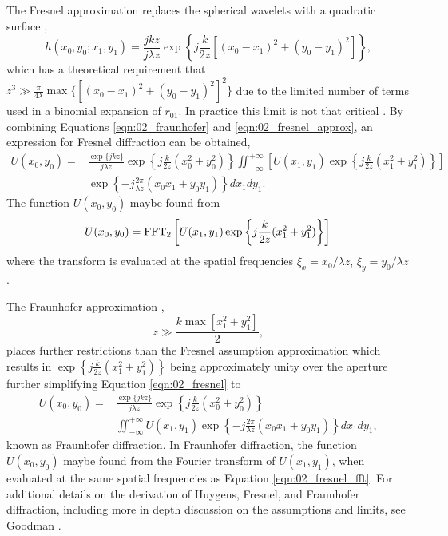 The Fresnel approximation replaces the spherical wavelets with a quadratic surface \cite{Fresnel-1818-FmMCMbDK},
\begin{equation}
  h(x_0,y_0;x_1,y_1) = \frac{jkz}{j\lambda z}\exp\left\{j\frac{k}{2z}[(x_0-x_1)^2+(y_0-y_1)^2]\right\} \textrm{,}
  \label{eqn:02_fresnel_approx}
\end{equation}
which has a theoretical requirement that $z^3 \gg \frac{\pi}{4\lambda}\max\{[(x_0-x_1)^2+(y_0-y_1)^2]^2\}$ due to the limited number of terms used in a binomial expansion of $r_{01}$.
In practice this limit is not that critical \cite{Goodman-1968-zPUmuuzx}.
By combining Equations \ref{eqn:02_fraunhofer} and \ref{eqn:02_fresnel_approx}, an expression for Fresnel diffraction can be obtained,
\begin{equation}
  \begin{aligned}
    U(x_0,y_0) =& \frac{\exp\{jkz\}}{j\lambda z}\exp\left\{j\frac{k}{2z}(x_0^2+y_0^2)\right\}\iint_{-\infty}^{+\infty}\left[U(x_1,y_1)\exp\left\{j\frac{k}{2z}(x_1^2+y_1^2)\right\}\right] \\
    &\exp\left\{-j\frac{2\pi}{\lambda z}(x_0x_1+y_0y_1)\right\} dx_1dy_1 \textrm{.}
  \end{aligned}
  \label{eqn:02_fresnel}
\end{equation}
The function $U(x_0,y_0)$ maybe found from
\begin{equation}
  U(x_0,y_0) = \operatorname{FFT_2}\left[U(x_1,y_1)\exp\left\{j\frac{k}{2z}(x_1^2+y_1^2)\right\}\right]
  \label{eqn:02_fresnel_fft}
\end{equation}
where the transform is evaluated at the spatial frequencies $\xi_x = x_0/\lambda z$, $\xi_y = y_0/\lambda z$.

The Fraunhofer approximation \cite{Goodman-1968-zPUmuuzx},
\begin{equation}
  z \gg \frac{k\max[x_1^2+y_1^2]}{2} \textrm{,}
  \label{eqn:02_fraunhofer_approx}
\end{equation}
places further restrictions than the Fresnel assumption approximation which results in
$\exp\left\{j\frac{k}{2z}(x_1^2+y_1^2)\right\}$ being approximately unity over the aperture further simplifying Equation \ref{eqn:02_fresnel} to
\begin{equation}
  \begin{aligned}
    U(x_0,y_0) =& \frac{\exp\{jkz\}}{j\lambda z}\exp\left\{j\frac{k}{2z}(x_0^2+y_0^2)\right\} \\
    &\iint_{-\infty}^{+\infty}U(x_1,y_1)\exp\left\{-j\frac{2\pi}{\lambda z}(x_0x_1+y_0y_1)\right\} dx_1dy_1 \textrm{,}
  \end{aligned}
  \label{eqn:02_fraunhofer}
\end{equation}
known as Fraunhofer diffraction.
In Fraunhofer diffraction, the function $U(x_0,y_0)$ maybe found from the Fourier transform of $U(x_1,y_1)$, when evaluated at the same spatial frequencies as Equation \ref{eqn:02_fresnel_fft}.
For additional details on the derivation of Huygens, Fresnel, and Fraunhofer diffraction, including more in depth discussion on the assumptions and limits, see Goodman \cite{Goodman-1968-zPUmuuzx}.

